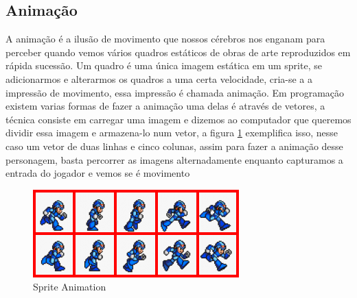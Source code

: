 \subsection{Animação}
\label{sec:animacao}
 A animação é a ilusão de movimento que nossos cérebros nos enganam para perceber quando vemos vários quadros estáticos de obras de arte reproduzidos em rápida sucessão.
Um quadro é uma única imagem estática em um sprite, se adicionarmos e alterarmos os quadros a uma certa velocidade, cria-se a a impressão de movimento, essa impressão é chamada animação. 
Em programação existem varias formas de fazer a animação uma delas é através de vetores, a técnica consiste em carregar uma imagem e dizemos ao computador que queremos dividir essa imagem e armazena-lo num vetor, a figura \ref{fig:sprite-animation} exemplifica isso, nesse caso um vetor de duas linhas e cinco colunas, assim para fazer a animação desse personagem, basta percorrer as imagens alternadamente enquanto capturamos a entrada do jogador e vemos se é movimento

\begin{figure}[h!]
    \centering
    \includegraphics[width=0.8\linewidth]{figuras/megaman-sprite-animation-export.png}
    \caption{Sprite Animation}
    \label{fig:sprite-animation}
\end{figure}







